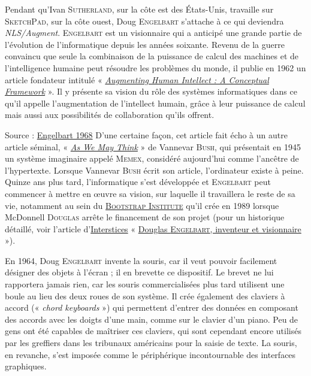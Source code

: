 
Pendant qu'Ivan \textsc{Sutherland}, sur la côte est des États-Unis, travaille sur \textsc{SketchPad}, sur la côte ouest, Doug \textsc{Engelbart} s'attache à ce qui deviendra \textit{NLS/Augment}. \textsc{Engelbart} est un visionnaire qui a anticipé une grande partie de l'évolution de l'informatique depuis les années soixante. Revenu de la guerre convaincu que seule la combinaison de la puissance de calcul des machines et de l’intelligence humaine peut résoudre les problèmes du monde, il publie en 1962 un article fondateur intitulé « \href{./Documents/Chapter01/engelbart-1962-AHI-framework-report.pdf}{\textit{Augmenting Human Intellect : A Conceptual Framework}} ». Il y présente sa vision du rôle des systèmes informatiques dans ce qu’il appelle l’augmentation de l’intellect humain, grâce à leur puissance de calcul mais aussi aux possibilités de collaboration qu'ils offrent.

%
{Source : \href{https://web.stanford.edu/dept/SUL/library/extra4/sloan/mousesite/1968Demo.html}{Engelbart 1968}}
D'une certaine façon, cet article fait écho à un autre article séminal, « \href{https://www.theatlantic.com/magazine/archive/1945/07/as-we-may-think/303881/}{\textit{As We May Think}} » de Vannevar \textsc{Bush}, qui présentait en 1945 un système imaginaire appelé \textsc{Memex}, considéré aujourd'hui comme l'ancêtre de l'hypertexte. Lorsque Vannevar \textsc{Bush} écrit son article, l'ordinateur existe à peine. Quinze ans plus tard, l'informatique s'est développée et \textsc{Engelbart} peut commencer à mettre en œuvre sa vision, sur laquelle il travaillera le reste de sa vie, notamment au sein du \href{http://dougengelbart.org/}{\textsc{Bootstrap Institute}} qu'il crée en 1989 lorsque McDonnell \textsc{Douglas} arrête le financement de son projet (pour un historique détaillé, voir l'article d'\href{https://interstices.info/}{Interstices} « \href{https://interstices.info/douglas-engelbart-inventeur-et-visionnaire/}{Douglas \textsc{Engelbart}, inventeur et visionnaire} »).

En 1964, Doug \textsc{Engelbart} invente la souris, car il veut pouvoir facilement désigner des objets à l'écran ; il en brevette ce dispositif. Le brevet ne lui rapportera jamais rien, car les souris commercialisées plus tard utilisent une boule au lieu des deux roues de son système. Il crée également des claviers à accord (« \textit{chord keyboards} ») qui permettent d'entrer des données en composant des accords avec les doigts d'une main, comme sur le clavier d'un piano. Peu de gens ont été capables de maîtriser ces claviers, qui sont cependant encore utilisés par les greffiers dans les tribunaux américains pour la saisie de texte. La souris, en revanche, s'est imposée comme le périphérique incontournable des interfaces graphiques.


